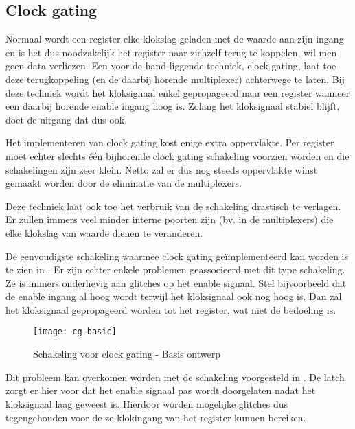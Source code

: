 \subsection{Clock gating\label{subsectie-implementatie-optimalisatie-clock-gating}}


Normaal wordt een register elke klokslag geladen met de waarde aan zijn ingang en is het dus noodzakelijk het register naar zichzelf terug te koppelen, wil men geen data verliezen. Een voor de hand liggende techniek, clock gating, laat toe deze terugkoppeling (en de daarbij horende multiplexer) achterwege te laten. Bij deze techniek wordt het kloksignaal enkel gepropageerd naar een register wanneer een daarbij horende enable ingang hoog is. Zolang het kloksignaal stabiel blijft, doet de uitgang dat dus ook.

Het implementeren van clock gating kost enige extra oppervlakte. Per register moet echter slechts \'e\'en bijhorende clock gating schakeling voorzien  worden en die schakelingen zijn zeer klein. Netto zal er dus nog steeds oppervlakte winst gemaakt worden door de eliminatie van de multiplexers.

Deze techniek laat ook toe het verbruik van de schakeling drastisch te verlagen. Er zullen immers veel minder interne poorten zijn (bv. in de multiplexers) die elke klokslag van waarde dienen te veranderen.

De eenvoudigste schakeling waarmee clock gating ge\"implementeerd kan worden is te zien in . Er zijn echter enkele problemen geassocieerd met dit type schakeling. Ze is immers onderhevig aan glitches op het enable signaal. Stel bijvoorbeeld dat de enable ingang al hoog wordt terwijl het kloksignaal ook nog hoog is. Dan zal het kloksignaal gepropageerd worden tot het register, wat niet de bedoeling is.

\begin{figure}[h]
	\centering
		\texttt{[image: cg-basic]}
		\caption{Schakeling voor clock gating - Basis ontwerp\label{figuur-implementatie-optimalisatie-cg-basic}}
\end{figure}

Dit probleem kan overkomen worden met de schakeling voorgesteld in . De latch zorgt er hier voor dat het enable signaal pas wordt doorgelaten nadat het kloksignaal laag geweest is. Hierdoor worden mogelijke glitches dus tegengehouden voor de ze klokingang van het register kunnen bereiken.

